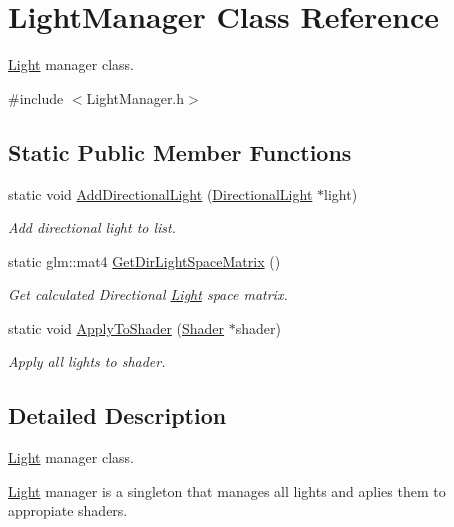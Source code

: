 \hypertarget{class_light_manager}{}\section{Light\+Manager Class Reference}
\label{class_light_manager}


\mbox{\hyperlink{class_light}{Light}} manager class.  




{\ttfamily \#include $<$Light\+Manager.\+h$>$}

\subsection*{Static Public Member Functions}
\begin{DoxyCompactItemize}
\item 
static void \mbox{\hyperlink{class_light_manager_a1002b006844e6b87e173dab3e9a26b17}{Add\+Directional\+Light}} (\mbox{\hyperlink{class_directional_light}{Directional\+Light}} $\ast$light)
\begin{DoxyCompactList}\small\item\em Add directional light to list. \end{DoxyCompactList}\item 
static glm\+::mat4 \mbox{\hyperlink{class_light_manager_a9d24844d79e4e6a62017584ce9f1a154}{Get\+Dir\+Light\+Space\+Matrix}} ()
\begin{DoxyCompactList}\small\item\em Get calculated Directional \mbox{\hyperlink{class_light}{Light}} space matrix. \end{DoxyCompactList}\item 
static void \mbox{\hyperlink{class_light_manager_a107e825c6ce685f9946ffbf83b6018de}{Apply\+To\+Shader}} (\mbox{\hyperlink{class_shader}{Shader}} $\ast$shader)
\begin{DoxyCompactList}\small\item\em Apply all lights to shader. \end{DoxyCompactList}\end{DoxyCompactItemize}


\subsection{Detailed Description}
\mbox{\hyperlink{class_light}{Light}} manager class. 

\mbox{\hyperlink{class_light}{Light}} manager is a singleton that manages all lights and aplies them to appropiate shaders. 

